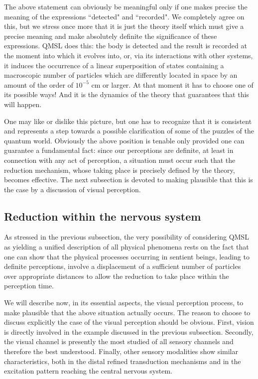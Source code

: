 \documentclass[10pt,a4paper]{article}
\begin{document}
The above statement can obviously be meaningful only if one makes
precise the meaning of the expressions ``detected" and
``recorded". We completely agree on this, but we stress once more
that it is just the theory itself which must give a precise
meaning and make absolutely definite the significance of these
expressions. QMSL does this: the body is detected and the result
is recorded at the moment into which it evolves into, or, via its
interactions with other systems, it induces the occurrence of a
linear superposition of states containing a macroscopic number of
particles which are differently located in space by an amount of
the order of $10^{-5}$ cm or larger. At that moment it has to
choose one of its possible ways! And it is the dynamics of the
theory that guarantees that this will happen.

One may like or dislike this picture, but one has to recognize
that it is consistent and represents a step towards a possible
clarification of some of the puzzles of the quantum world.
Obviously the above position is tenable only provided one can
guarantee a fundamental fact: since our perceptions are definite,
at least in connection with any act of perception, a situation
must occur such that the reduction mechanism, whose taking place
is precisely defined by the theory, becomes effective. The next
subsection is devoted to making plausible that this is the case by
a discussion of visual perception.


\subsection{Reduction within the nervous system} \label{sec143}

As stressed in the previous subsection, the very possibility of
considering QMSL as yielding a unified description of all physical
phenomena rests on the fact that one can show that the physical
processes occurring in sentient beings, leading to definite
perceptions, involve a displacement of a sufficient number of
particles over appropriate distances to allow the reduction to
take place within the perception time.

We will describe now, in its essential aspects, the visual
perception process, to make plausible that the above situation
actually occurs. The reason to choose to discuss explicitly the
case of the visual perception should be obvious. First, vision is
directly involved in the example discussed in the previous
subsection. Secondly, the visual channel is presently the most
studied of all sensory channels and therefore the best understood.
Finally, other sensory modalities show similar characteristics,
both in the distal refined transduction mechanisms and in the
excitation pattern reaching the central nervous system.
\end{document}
